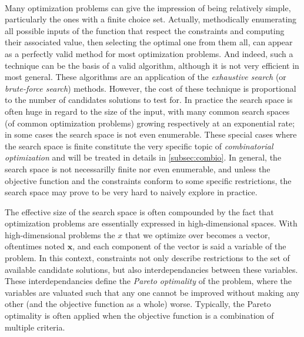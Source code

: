 	\paragraph{}
	Many optimization problems can give the impression of being relatively simple, particularly the ones with a finite choice set.
	Actually, methodically enumerating all possible inputs of the function that respect the constraints and computing their associated value, then selecting the optimal one from them all, can appear as a perfectly valid method for most optimization problems.
	And indeed, such a technique can be the basis of a valid algorithm, although it is not very efficient in most general.
	These algorithms are an application of the \emph{exhaustive search} (or \emph{brute-force search}) methods.
	However, the cost of these technique is proportional to the number of candidates solutions to test for.
	In practice the search space is often huge in regard to the size of the input, with many common search spaces (of common optimization problems) growing respectively at an exponential rate; in some cases the search space is not even enumerable.
	These special cases where the search space is finite constitute the very specific topic of \emph{combinatorial optimization} and will be treated in details in \cref{subsec:combio}.
	In general, the search space is not necessarilly finite nor even enumerable, and unless the objective function and the constraints conform to some specific restrictions, the search space may prove to be very hard to naively explore in practice.

	The effective size of the search space is often compounded by the fact that optimization problems are essentially expressed in high-dimensional spaces.
	With high-dimensional problems the $x$ that we optimize over becomes a vector, oftentimes noted $\mathbf{x}$, and each component of the vector is said a variable of the problem.
	In this context, constraints not only describe restrictions to the set of available candidate solutions, but also interdependancies between these variables.
	These interdependancies define the \emph{Pareto optimality} of the problem, where the variables are valuated such that any one cannot be improved without making any other (and the objective function as a whole) worse.
	Typically, the Pareto optimality is often applied when the objective function is a combination of multiple criteria.

